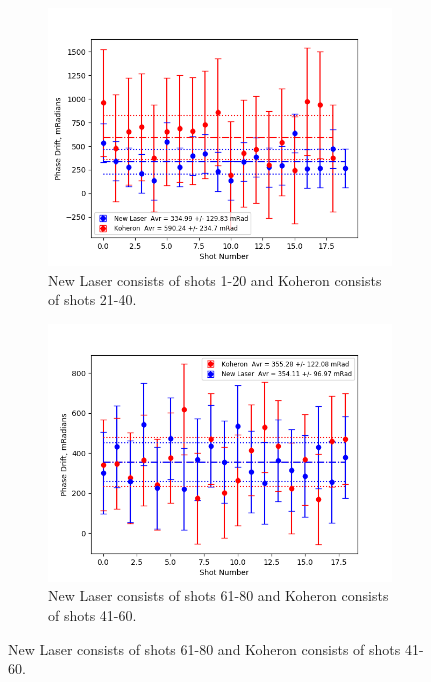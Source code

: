 \documentclass[12pt,a4paper,oneside]{report}
\begin{document}
\begin{figure}[H] 
\begin{subfigure}{.5\textwidth}
\centering\captionsetup{width=.9\linewidth}
\includegraphics[width=\textwidth, angle=0]{DImages/Max_-_Min_Drift_for_Shots_1and_2.png}
\caption{New Laser consists of shots 1-20 and Koheron consists of shots 21-40.}
\end{subfigure}
\begin{subfigure}{.5\textwidth}
\centering\captionsetup{width=.9\linewidth}
\includegraphics[width=\textwidth, angle=0]{DImages/Max_-_Min_Drift_for_Shots_3and_4.png}
\caption{New Laser consists of shots 61-80 and Koheron consists of shots 41-60.}
\end{subfigure}

\end{figure}
\end{document}
